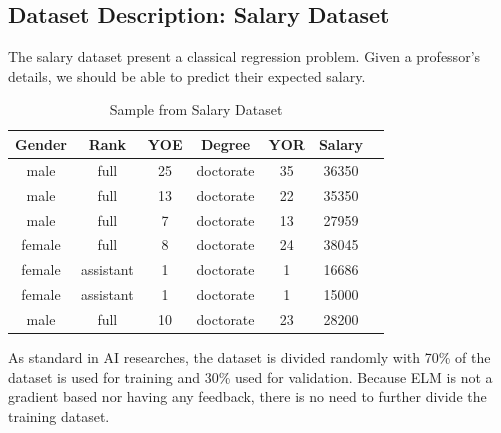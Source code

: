\documentclass[13pt]{article}
\begin{document}
\subsection{Dataset Description: Salary Dataset}
The salary dataset present a classical regression problem. Given a professor's details, we should be able to predict their expected salary.\\
\begin{table}[H]
    \begin{center}
        \begin{tabular}{c c c c c c c }
            Gender & Rank & YOE & Degree & YOR & Salary\\\hline
            male & full & 25 & doctorate & 35 & 36350 \\ 
            male & full & 13 & doctorate & 22 & 35350\\ 
            male & full & 7 & doctorate & 13 & 27959\\ 
            female & full & 8 & doctorate & 24 & 38045\\ 
            female & assistant & 1 & doctorate & 1 & 16686\\ 
            female & assistant & 1 & doctorate & 1 & 15000\\ 
            male & full & 10 & doctorate & 23 & 28200\\ 
            
        \end{tabular}
        \caption{Sample from Salary Dataset}
        \label{tab:sample}
    \end{center}
\end{table}
As standard in AI researches, the dataset is divided randomly with 70\% of the dataset is used for training and 30\% used for validation. Because ELM is not a gradient based nor having any feedback, there is no need to further divide the training dataset.
\end{document}

